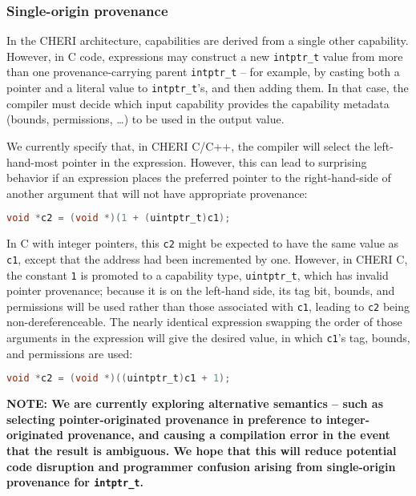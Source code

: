 \documentclass[11pt]{article}
\newcommand{\uintptr}{\texttt{uintptr\_t}\xspace}
\newcommand{\intptr}{\texttt{intptr\_t}\xspace}
\newcommand{\note}[2]{{\color{blue}[ Note: #1 - #2]}}
\renewcommand{\note}[2]{}
\newcommand{\amnote}[1]{\note{#1}{Alfredo M.}}
\begin{document}
\amnote{Should we mention code that assumes that it is ok to go out of bounds
for optimization purposes? E.g., strcmp loading a word at a time?}

\subsubsection{Single-origin provenance}
In the CHERI architecture, capabilities are derived from a single other
capability.
However, in C code, expressions may construct a new \intptr value from more
than one provenance-carrying parent \intptr{} -- for example, by casting both a
pointer and a literal value to \intptr{}'s, and then adding them.
In that case, the compiler must decide which input capability provides the
capability metadata (bounds, permissions, \ldots{}) to be used in the output
value.

We currently specify that, in CHERI C/C++, the compiler will select the
left-hand-most pointer in the expression.
However, this can lead to surprising behavior if an expression places the
preferred pointer to the right-hand-side of another argument that will not
have appropriate provenance:

\begin{lstlisting}[language=C]
void *c2 = (void *)(1 + (uintptr_t)c1);
\end{lstlisting}

In C with integer pointers, this \texttt{c2} might be expected to have the
same value as \texttt{c1}, except that the address had been incremented by one.
However, in CHERI C, the constant \texttt{1} is promoted to a capability
type, \uintptr, which has invalid pointer provenance; because it
is on the left-hand side, its tag bit, bounds, and permissions will be used
rather than those associated with \texttt{c1}, leading to \texttt{c2} being
non-dereferenceable.
The nearly identical expression swapping the order of those arguments in the
expression will give the desired value, in which \texttt{c1}'s tag, bounds,
and permissions are used:

\begin{lstlisting}[language=C]
void *c2 = (void *)((uintptr_t)c1 + 1);
\end{lstlisting}

\textbf{NOTE:
We are currently exploring alternative semantics -- such as selecting
pointer-originated provenance in preference to integer-originated provenance,
and causing a compilation error in the event that the result is ambiguous.
We hope that this will reduce potential code disruption and programmer
confusion arising from single-origin provenance for \intptr.}
\end{document}

